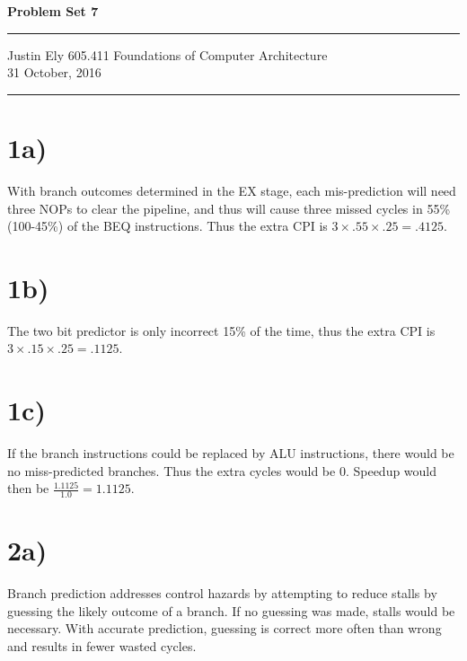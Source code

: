 \documentclass[a4paper,11pt]{article}
\begin{document}
\begin{flushright}

\vspace{1.1cm}

{\bf\Huge Problem Set 7}

\rule{0.25\linewidth}{0.5pt}

\vspace{0.5cm}
Justin Ely
\linebreak
\newline
\footnotesize{605.411 Foundations of Computer Architecture \\}
\vspace{0.5cm}
31 October, 2016
\end{flushright}

\noindent\rule{\linewidth}{1.0pt}


\section*{1a)}
With branch outcomes determined in the EX stage, each mis-prediction
will need three NOPs to clear the pipeline, and thus will cause three missed
cycles in 55\% (100-45\%) of the BEQ instructions.  Thus the extra CPI is $3 \times .55 \times .25 = .4125$.

\section*{1b)}
The two bit predictor is only incorrect 15\% of the time, thus the extra CPI is 
$3 \times .15 \times .25 = .1125$.

\section*{1c)}
If the branch instructions could be replaced by ALU instructions, there would
be no miss-predicted branches.  Thus the extra cycles would be 0.  Speedup would
then be $\frac{1.1125}{1.0} = 1.1125$.


\section*{2a)} 
Branch prediction addresses control hazards by attempting to reduce stalls
by guessing the likely outcome of a branch. If no guessing was made, stalls 
would be necessary.  With accurate prediction, guessing is correct more often 
than wrong and results in fewer wasted cycles.
\end{document}
